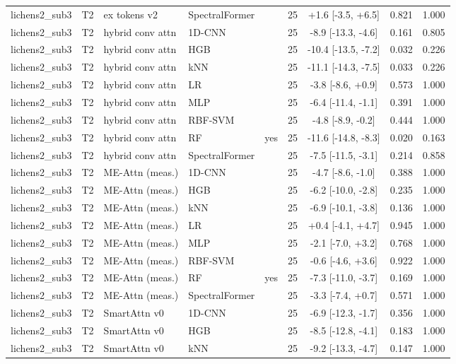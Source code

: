 \begin{tabular}{lllllcccc}
lichens2_sub3 & T2 & ex tokens v2 & SpectralFormer &  & 25 & +1.6 [-3.5, +6.5] & 0.821 & 1.000 \\
lichens2_sub3 & T2 & hybrid conv attn & 1D-CNN &  & 25 & -8.9 [-13.3, -4.6] & 0.161 & 0.805 \\
lichens2_sub3 & T2 & hybrid conv attn & HGB &  & 25 & -10.4 [-13.5, -7.2] & 0.032 & 0.226 \\
lichens2_sub3 & T2 & hybrid conv attn & kNN &  & 25 & -11.1 [-14.3, -7.5] & 0.033 & 0.226 \\
lichens2_sub3 & T2 & hybrid conv attn & LR &  & 25 & -3.8 [-8.6, +0.9] & 0.573 & 1.000 \\
lichens2_sub3 & T2 & hybrid conv attn & MLP &  & 25 & -6.4 [-11.4, -1.1] & 0.391 & 1.000 \\
lichens2_sub3 & T2 & hybrid conv attn & RBF-SVM &  & 25 & -4.8 [-8.9, -0.2] & 0.444 & 1.000 \\
lichens2_sub3 & T2 & hybrid conv attn & RF & yes & 25 & -11.6 [-14.8, -8.3] & 0.020 & 0.163 \\
lichens2_sub3 & T2 & hybrid conv attn & SpectralFormer &  & 25 & -7.5 [-11.5, -3.1] & 0.214 & 0.858 \\
lichens2_sub3 & T2 & ME-Attn (meas.) & 1D-CNN &  & 25 & -4.7 [-8.6, -1.0] & 0.388 & 1.000 \\
lichens2_sub3 & T2 & ME-Attn (meas.) & HGB &  & 25 & -6.2 [-10.0, -2.8] & 0.235 & 1.000 \\
lichens2_sub3 & T2 & ME-Attn (meas.) & kNN &  & 25 & -6.9 [-10.1, -3.8] & 0.136 & 1.000 \\
lichens2_sub3 & T2 & ME-Attn (meas.) & LR &  & 25 & +0.4 [-4.1, +4.7] & 0.945 & 1.000 \\
lichens2_sub3 & T2 & ME-Attn (meas.) & MLP &  & 25 & -2.1 [-7.0, +3.2] & 0.768 & 1.000 \\
lichens2_sub3 & T2 & ME-Attn (meas.) & RBF-SVM &  & 25 & -0.6 [-4.6, +3.6] & 0.922 & 1.000 \\
lichens2_sub3 & T2 & ME-Attn (meas.) & RF & yes & 25 & -7.3 [-11.0, -3.7] & 0.169 & 1.000 \\
lichens2_sub3 & T2 & ME-Attn (meas.) & SpectralFormer &  & 25 & -3.3 [-7.4, +0.7] & 0.571 & 1.000 \\
lichens2_sub3 & T2 & SmartAttn v0 & 1D-CNN &  & 25 & -6.9 [-12.3, -1.7] & 0.356 & 1.000 \\
lichens2_sub3 & T2 & SmartAttn v0 & HGB &  & 25 & -8.5 [-12.8, -4.1] & 0.183 & 1.000 \\
lichens2_sub3 & T2 & SmartAttn v0 & kNN &  & 25 & -9.2 [-13.3, -4.7] & 0.147 & 1.000 \\

\end{tabular}
